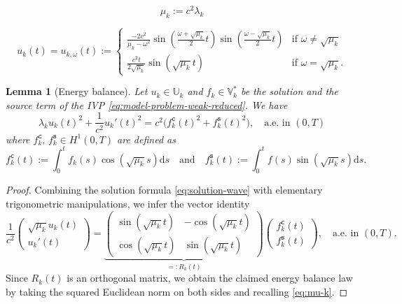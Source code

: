 \documentclass[10pt,a4paper]{amsart}
\newtheorem{lemma}{Lemma}
\newcommand{\data}{\mathbb{V}^*}
\newcommand{\fcos}{f_{k}^{\mathtt{c}}}
\newcommand{\fsin}{f_{k}^{\mathtt{s}}}
\newcommand{\trial}{\mathbb{U}}
\begin{document}
\begin{equation}
\label{eq:mu-k}
	\mu_k := c^2 \lambda_k
\end{equation}

\begin{equation}
	\label{eq:solution-wave}
	u_k(t) = u_{k,\omega}(t) := \begin{cases}
		 \displaystyle \frac{-2c^2}{\mu_k-\omega^2}\sin\left(\frac{\omega + \sqrt{\mu_k}}{2}t\right)\sin\left(\frac{\omega-\sqrt{\mu_k}}{2}t\right) & \text{if } \omega \neq \sqrt{\mu_k} \\[10pt]
		 \displaystyle\frac{c^2 t}{2\sqrt{\mu_k}}\sin(\sqrt{\mu_k} t) & \text{if } \omega = \sqrt{\mu_k}.
	\end{cases}
\end{equation}

\begin{lemma}[Energy balance]
\label{L:energy-balance}
Let $u_{k} \in \trial_k$ and $f_k \in \data_k$ be the solution and the source term of the IVP \eqref{eq:model-problem-weak-reduced}. We have
\begin{equation}
\label{eq:energy-balance}
\lambda_k u_k(t)^2 + \frac{1}{c^2}u_k'(t)^2  = c^2\Big (\fcos(t)^2 + \fsin(t)^2 \Big ), \quad \text{a.e. in $(0,T)$}
\end{equation}
where $\fcos,\,\fsin \in H^1(0,T)$ are defined as
\begin{equation}
\label{eq:fcos-fsin}
\fcos(t)  := \int_0^t f_k(s)\cos{(\sqrt{\mu_k} s)} \mathrm{d}s  
\quad \text{and} \quad 
\fsin(t)  := \int_0^t f(s)\sin{(\sqrt{\mu_k} s)}\mathrm{d}s.
\end{equation}
\end{lemma}

\begin{proof}
Combining the solution formula \eqref{eq:solution-wave} with elementary trigonometric manipulations, we infer the vector identity
\begin{equation*}
	\frac{1}{c^2}
	\begin{pmatrix}
		\sqrt{\mu_k}u_k(t)\\[3pt]
		u_k'(t)
	\end{pmatrix}
	=
	\underbrace{\begin{pmatrix}
		\sin(\sqrt{\mu_k}t) & -\cos(\sqrt{\mu_k}t)\\[3pt]
		\cos(\sqrt{\mu_k}t) &  \sin(\sqrt{\mu_k}t)
	\end{pmatrix}}_{=: R_k(t)}
	\begin{pmatrix}
		\fcos(t)\\[3pt]
		\fsin(t)
	\end{pmatrix}, 
	\quad \text{a.e. in $(0,T)$}.
\end{equation*}
Since $R_k(t)$ is an orthogonal matrix, we obtain the claimed energy balance law by taking the squared Euclidean norm on both sides and recalling \eqref{eq:mu-k}.
\end{proof}
\end{document}
